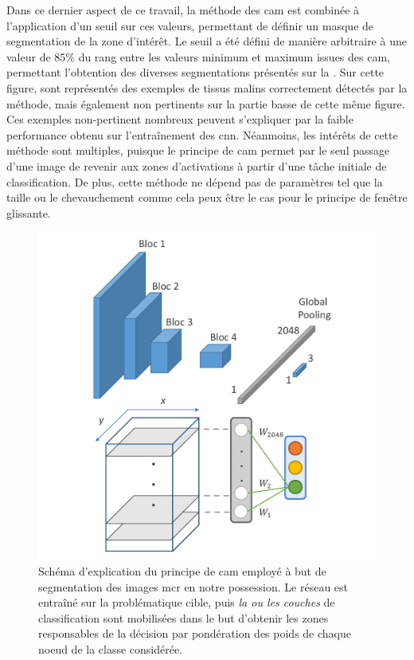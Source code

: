 Dans ce dernier aspect de ce travail, la méthode des \gls{cam} est combinée à l'application d'un seuil sur ces valeurs, permettant de définir un masque de segmentation de la zone d'intérêt. Le seuil a été défini de manière arbitraire à une valeur de 85\% du rang entre les valeurs minimum et maximum issues des \gls{cam}, permettant l'obtention des diverses segmentations présentés sur la . Sur cette figure, sont représentés des exemples de tissus malins correctement détectés par la méthode, mais également non pertinents sur la partie basse de cette même figure. Ces exemples non-pertinent nombreux peuvent s'expliquer par la faible performance obtenu sur l'entraînement des \gls{cnn}. Néanmoins, les intérêts de cette méthode sont multiples, puisque le principe de \gls{cam} permet par le seul passage d'une image de revenir aux zones d'activations à partir d'une tâche initiale de classification. De plus, cette méthode ne dépend pas de paramètres tel que la taille ou le chevauchement comme cela peux être le cas pour le principe de fenêtre glissante.\par

\begin{figure}[H]
    \centering
    \includegraphics[width=\linewidth]{contents/chapter_6/resources/scheme_image_improvement_cam.pdf}
    \caption{Schéma d'explication du principe de \gls{cam} employé à but de segmentation des images \gls{mcr} en notre possession. Le réseau est entraîné sur la problématique cible, puis \textit{la ou les couches} de classification sont mobilisées dans le but d'obtenir les zones responsables de la décision par pondération des poids de chaque noeud de la classe considérée.}
    \label{fig:scheme_image_improvement_cam}
\end{figure}\par

